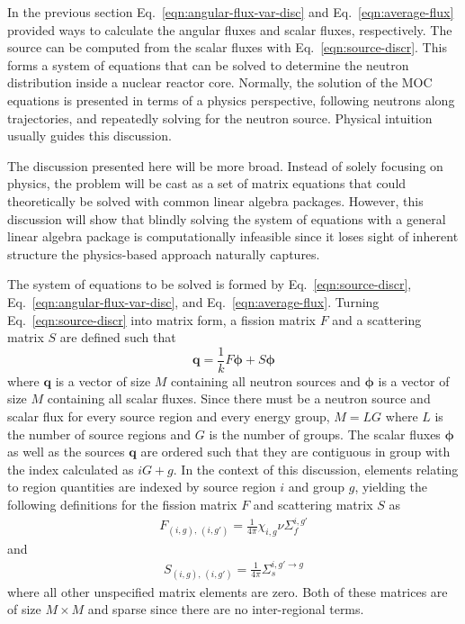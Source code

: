 In the previous section Eq.~\ref{eqn:angular-flux-var-disc} and Eq.~\ref{eqn:average-flux} provided ways to calculate the angular fluxes and scalar fluxes, respectively. The source can be computed from the scalar fluxes with Eq.~\ref{eqn:source-discr}. This forms a system of equations that can be solved to determine the neutron distribution inside a nuclear reactor core. Normally, the solution of the MOC equations is presented in terms of a physics perspective, following neutrons along trajectories, and repeatedly solving for the neutron source. Physical intuition usually guides this discussion.

The discussion presented here will be more broad. Instead of solely focusing on physics, the problem will be cast as a set of matrix equations that could theoretically be solved with common linear algebra packages. However, this discussion will show that blindly solving the system of equations with a general linear algebra package is computationally infeasible since it loses sight of inherent structure the physics-based approach naturally captures.

The system of equations to be solved is formed by Eq.~\ref{eqn:source-discr}, Eq.~\ref{eqn:angular-flux-var-disc}, and Eq.~\ref{eqn:average-flux}. Turning Eq.~\ref{eqn:source-discr} into matrix form, a fission matrix $F$ and a scattering matrix $S$ are defined such that
\begin{equation}
\mathbf{q} = \frac{1}{k} F \boldsymbol{\phi} + S \boldsymbol{\phi}
\label{eqn:matrix-source-calc}
\end{equation}
where $\mathbf{q}$ is a vector of size $M$ containing all neutron sources and $\boldsymbol{\phi}$ is a vector of size $M$ containing all scalar fluxes. Since there must be a neutron source and scalar flux for every source region and every energy group, $M = L G$ where $L$ is the number of source regions and $G$ is the number of groups. The scalar fluxes $\boldsymbol{\phi}$ as well as the sources $\mathbf{q}$ are ordered such that they are contiguous in group with the index calculated as $i G + g$. In the context of this discussion, elements relating to region quantities are indexed by source region $i$ and group $g$, yielding the following definitions for the fission matrix $F$ and scattering matrix $S$ as
\begin{eqnarray}
F_{\left(i, g\right), \, \left(i, g'\right)} = \frac{1}{4\pi} \chi_{i,g} \nu \Sigma_f^{i,g'}
\label{eqn:fission-matrix}
\end{eqnarray}
and
\begin{eqnarray}
S_{\left(i, g\right), \, \left(i, g'\right)} = \frac{1}{4\pi} \Sigma_s^{i,g' \rightarrow g}
\label{eqn:scattering-matrix}
\end{eqnarray}
where all other unspecified matrix elements are zero. Both of these matrices are of size $M \times M$ and sparse since there are no inter-regional terms.

